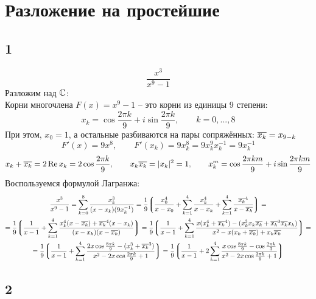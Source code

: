\section{Разложение на простейшие}

\subsection{1}

$$ \frac{x^3}{x^9 - 1} $$
Разложим над $ \mathbb{C} $: \\
Корни многочлена $ F(x) = x^9 - 1 $ -- это корни из единицы 9 степени:
$$ x_k = \cos \frac{2\pi k}9 + i \sin \frac{2 \pi k}9, \qquad k = 0, ..., 8 $$
При этом, $ x_0 = 1 $, а остальные разбиваются на пары сопряжённых: $ \overline{x_k} = x_{9 - k} $
$$ F'(x) = 9x^8, \qquad F'(x_k) = 9x_k^8 = 9x_k^9x_k^{-1} = 9x_k^{-1} $$
$$ x_k + \overline{x_k} = 2\operatorname{Re}x_k = 2\cos \frac{2\pi k}9, \qquad x_k\overline{x_k} = |x_k|^2 = 1, \qquad x_k^m = \cos\frac{2\pi k m}9 + i \sin \frac{2\pi km}9 $$
Воспользуемся формулой Лагранжа:
\begin{multline*}
    \frac{x^3}{x^9 - 1} = \sum_{k = 0}^8 \frac{x_k^3}{(x - x_k)(9x_k^{-1})} = \frac19 \bigg\lgroup \frac{x_0^4}{x - x_0} + \sum_{k = 1}^4 \frac{x_k^4}{x - x_k} + \sum_{k = 1}^4 \frac{\overline{x_k}^4}{x - \overline{x_k}} \bigg\rgroup = \\
    = \frac19 \bigg\lgroup \frac1{x - 1} + \sum_{k = 1}^4 \frac{x_k^4(x - \overline{x_k}) + \overline{x_k}^4(x - x_k)}{(x - x_k)(x - \overline{x_k})} \bigg\rgroup = \frac19 \bigg\lgroup \frac1{x - 1} + \sum_{k = 1}^4 \frac{x(x_k^4 + \overline{x_k}^4) - (x_k^3x_k\overline{x_k} + \overline{x_k}^3\overline{x_k}x_k)}{x^2 - x(x_k + \overline{x_k}) + x_k\overline{x_k}} \bigg\rgroup = \\
    = \frac19 \bigg\lgroup \frac1{x - 1} + \sum_{k = 1}^4 \frac{2x\cos\frac{8\pi k}9 - (x_k^3 + \overline{x_k}^3)}{x^2 - 2x\cos\frac{2\pi k}9 + 1} \bigg\rgroup = \frac19 \bigg\lgroup \frac1{x - 1} + 2\sum_{k = 1}^4 \frac{x\cos\frac{8\pi k}9 - \cos\frac{2\pi k}3}{x^2 - 2x\cos\frac{2\pi k}9 + 1} \bigg\rgroup
\end{multline*}

\subsection{2}


